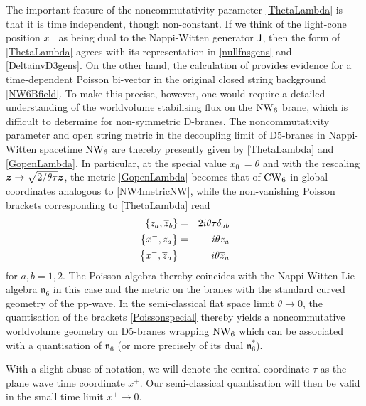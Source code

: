 The important feature of the noncommutativity parameter \eqref{ThetaLambda} is
that it is time independent, though non-constant. If we think of the light-cone
position $x^-$ as being dual to the Nappi-Witten generator ${\sf J}$, then the form
of \eqref{ThetaLambda} agrees with its representation in \eqref{nullfnsgens} and
\eqref{DeltainvD3gens}. On the other hand, the calculation of \cite{DN1}
provides evidence for a time-dependent Poisson bi-vector in the original closed
string background \eqref{NW6Bfield}. To make this precise, however, one would
require a detailed understanding of the worldvolume stabilising flux on the
$\operatorname{NW}_6$ brane, which is difficult to determine for non-symmetric D-branes. The
noncommutativity parameter and open string metric in the decoupling limit of
D5-branes in Nappi-Witten spacetime $\operatorname{NW}_6$ are thereby presently given by
\eqref{ThetaLambda} and \eqref{GopenLambda}. In particular, at the special value
$x_0^-=\theta$ and with the rescaling ${{\boldsymbol {z} }}\to\sqrt{2/\theta \tau} {{\boldsymbol {z} }}$, the metric
\eqref{GopenLambda} becomes that of $\operatorname{CW}_6$ in global coordinates analogous to
\eqref{NW4metricNW}, while the non-vanishing Poisson brackets corresponding to
\eqref{ThetaLambda} read
\begin{eqnarray}
  \label{Poissonspecial}
  \left\{z_a, \overline{z}_b\right\}&=&2 i\theta \tau \delta_{ab}\\\nonumber
  \left\{x^-, z_a\right\}&=&- i\theta z_a\\\nonumber
  \left\{x^-, \overline{z}_a\right\}&=& i\theta \overline{z}_a
\end{eqnarray}
for $a,b=1,2$. The Poisson algebra thereby coincides with the Nappi-Witten Lie
algebra $\mathfrak{n}_6$ in this case and the metric on the branes with the
standard curved geometry of the pp-wave. In the semi-classical flat space limit
$\theta\to0$, the quantisation of the brackets \eqref{Poissonspecial} thereby
yields a noncommutative worldvolume geometry on D5-branes wrapping $\operatorname{NW}_6$ which
can be associated with a quantisation of $\mathfrak{n}_6$ (or more precisely of
its dual $\mathfrak{n}_6^*$).

With a slight abuse of notation, we will denote the central coordinate $\tau$ as
the plane wave time coordinate $x^+$. Our semi-classical quantisation will then
be valid in the small time limit $x^+\to0$.

